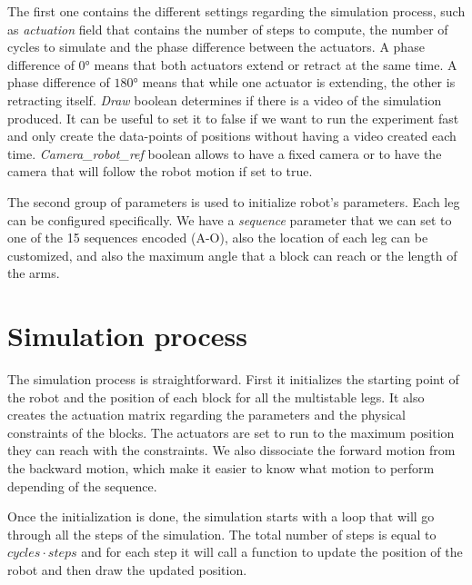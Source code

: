         The first one contains the different settings regarding the simulation process, such as \textit{actuation} field that contains the number of steps to compute, the number of cycles to simulate and the phase difference between the actuators. A phase difference of $0$° means that both actuators extend or retract at the same time. A phase difference of $180$° means that while one actuator is extending, the other is retracting itself. \textit{Draw} boolean determines if there is a video of the simulation produced. It can be useful to set it to false if we want to run the experiment fast and only create the data-points of positions without having a video created each time. \textit{Camera\_robot\_ref} boolean allows to have a fixed camera or to have the camera that will follow the robot motion if set to true.
        
        The second group of parameters is used to initialize robot's parameters. Each leg can be configured specifically. We have a \textit{sequence} parameter that we can set to one of the 15 sequences encoded (A-O), also the location of each leg can be customized, and also the maximum angle that a block can reach or the length of the arms.
        
    \section{Simulation process}
        The simulation process is straightforward. First it initializes the starting point of the robot and the position of each block for all the multistable legs. It also creates the actuation matrix regarding the parameters and the physical constraints of the blocks. The actuators are set to run to the maximum position they can reach with the constraints. We also dissociate the forward motion from the backward motion, which make it easier to know what motion to perform depending of the sequence.
        
        Once the initialization is done, the simulation starts with a loop that will go through all the steps of the simulation. The total number of steps is equal to $cycles \cdot steps$ and for each step it will call a function to update the position of the robot and then draw the updated position. 
        
